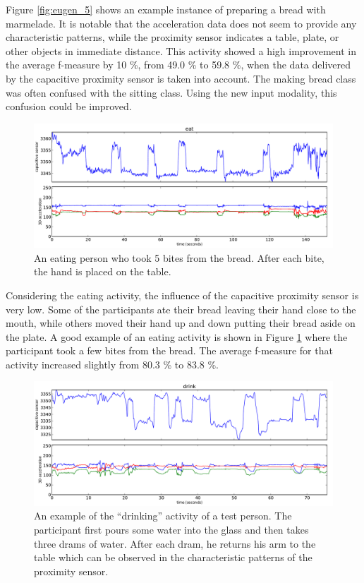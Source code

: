 \documentclass[runningheads,a4paper]{llncs}
\begin{document}
Figure \ref{fig:eugen_5} shows an example instance of preparing a bread with marmelade. It is notable that the acceleration data does not seem to provide any characteristic patterns, while the proximity sensor indicates a table, plate, or other objects in immediate distance. This activity showed a high improvement in the average f-measure by 10 \%, from 49.0 \% to 59.8 \%, when the data delivered by the capacitive proximity sensor is taken into account. The making bread class was often confused with the sitting class. Using the new input modality, this confusion could be improved.

\begin{figure}[htpb]
	\centering
		\includegraphics[width=\textwidth]{../Auswertung/images/eugen_6.pdf}
	\caption{An eating person who took 5 bites from the bread. After each bite, the hand is placed on the table.}
	\label{fig:eugen_6}
\end{figure}

Considering the eating activity, the influence of the capacitive proximity sensor is very low. Some of the participants ate their bread leaving their hand close to the mouth, while others moved their hand up and down putting their bread aside on the plate. A good example of an eating activity is shown in Figure \ref{fig:eugen_6} where the participant took a few bites from the bread. The average f-measure for that activity increased slightly from 80.3 \% to 83.8 \%. 

\begin{figure}[htpb]
	\centering
		\includegraphics[width=\textwidth]{../Auswertung/images/eugen_7.pdf}
	\caption{An example of the ``drinking'' activity of a test person. The participant first pours some water into the glass and then takes three drams of water. After each dram, he returns his arm to the table which can be observed in the characteristic patterns of the proximity sensor.}
	\label{fig:eugen_7}
\end{figure}
\end{document}
